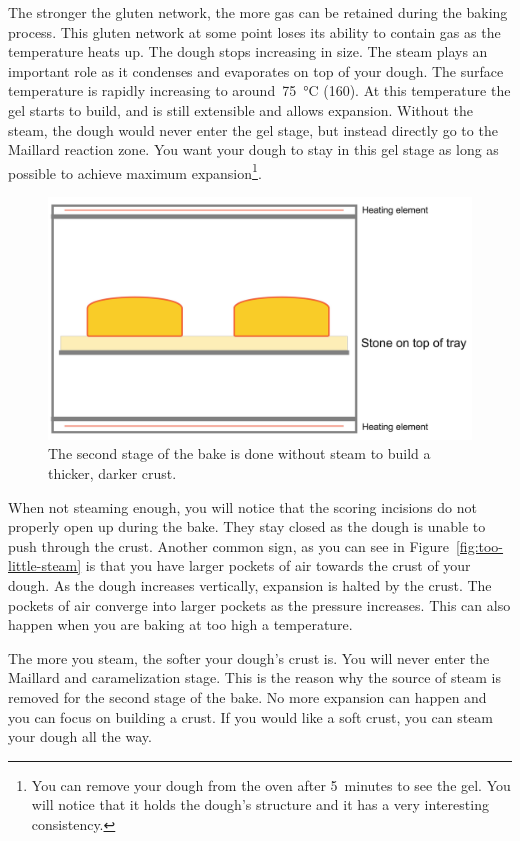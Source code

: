 The stronger the gluten network, the more gas can be retained
during the baking process. This gluten network at some point
loses its ability to contain gas as the temperature heats
up. The dough stops increasing in size. The steam plays
an important role as it condenses and evaporates on top
of your dough. The surface temperature is rapidly increasing
to around~\qty{75}{\degreeCelsius} (\qty{160}{\degF}). At this temperature the
gel starts to build, and is still extensible and allows expansion.
Without the steam, the dough would never enter the gel stage,
but instead directly go to the Maillard reaction zone. You
want your dough to stay in this gel stage as long as possible
to achieve maximum expansion\footnote{You can remove your
dough from the oven after 5~minutes to see the gel. You will notice
that it holds the dough's structure and it has a very interesting consistency.}.

\begin{figure}[!htb]
  \includegraphics[width=\textwidth]{baking-process-stage-2.jpg}
  \caption[Baking step~2, without steam]{The second stage of the bake is done
      without steam to build a thicker, darker crust.}
\end{figure}

When not steaming enough, you will notice that the scoring
incisions do not properly open up during the bake. They stay
closed as the dough is unable to push through the crust.
Another common sign, as you can see in Figure~\ref{fig:too-little-steam} is
that you have larger pockets of air towards the crust of your dough. As the
dough increases vertically, expansion is halted by the crust. The pockets
of air converge into larger pockets as the pressure increases.
This can also happen when you are baking at too high a temperature.

The more you steam, the softer your dough's crust is. You will never
enter the Maillard and caramelization stage. This
is the reason why the source of steam is removed
for the second stage of the bake. No more expansion can
happen and you can focus on building a crust. If you
would like a soft crust, you can steam your dough all the
way.

